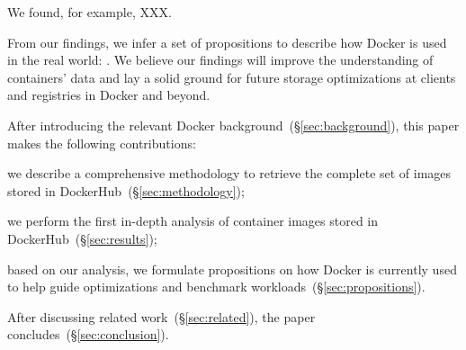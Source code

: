 We found, for example, XXX.
%

From our findings, we infer a set of propositions to describe how Docker is
used in the real world:
.
%
We believe our findings will improve the understanding of containers' data and lay
a solid ground for future storage optimizations at clients and registries in
Docker and beyond.

After introducing the relevant Docker background~(\S\ref{sec:background}),
this paper makes the following contributions:
\begin{compactitemize}
  \item we describe a comprehensive methodology to retrieve the complete set of
  	images stored in DockerHub~(\S\ref{sec:methodology});
  \item we perform the first in-depth analysis of container images stored in
    DockerHub~(\S\ref{sec:results});
  \item based on our analysis, we formulate propositions on how Docker is currently
    used to help guide optimizations and benchmark
    workloads~(\S\ref{sec:propositions}).
\end{compactitemize}

After discussing related work~(\S\ref{sec:related}),
the paper concludes~(\S\ref{sec:conclusion}).

